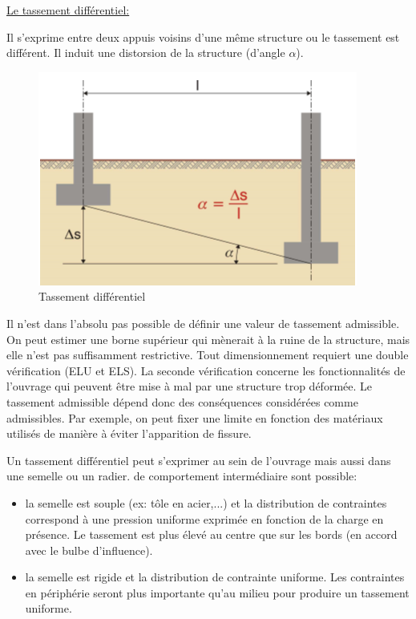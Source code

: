             \underline{Le tassement différentiel:} 
            
            Il s'exprime entre deux appuis voisins d'une même structure ou le tassement est différent. Il induit une distorsion de la structure (d'angle $\alpha$).
            
            \begin{figure}[h!]
                \centering
                \includegraphics[scale=0.8]{Holeyman/images/H32.PNG}
                \caption{Tassement différentiel}
            \end{figure}
            
            Il n'est dans l'absolu pas possible de définir une valeur de tassement admissible. On peut estimer une borne supérieur qui mènerait à la ruine de la structure, mais elle n'est pas suffisamment restrictive. Tout dimensionnement requiert une double vérification (ELU et ELS). La seconde vérification concerne les fonctionnalités de l'ouvrage qui peuvent être mise à mal par une structure trop déformée. Le tassement admissible dépend donc des conséquences considérées comme admissibles. Par exemple, on peut fixer une limite en fonction des matériaux utilisés de manière à éviter l'apparition de fissure.
            
            Un tassement différentiel peut s'exprimer au sein de l'ouvrage mais aussi dans une semelle ou un radier. de comportement intermédiaire sont possible:
            \begin{itemize}
                \item la semelle est souple (ex: tôle en acier,...) et la distribution de contraintes correspond à une pression uniforme exprimée en fonction de la charge en présence. Le tassement est plus élevé au centre que sur les bords (en accord avec le bulbe d'influence).
                \item la semelle est rigide et la distribution de contrainte uniforme. Les contraintes en périphérie seront plus importante qu'au milieu pour produire un tassement uniforme.
            \end{itemize}
            
